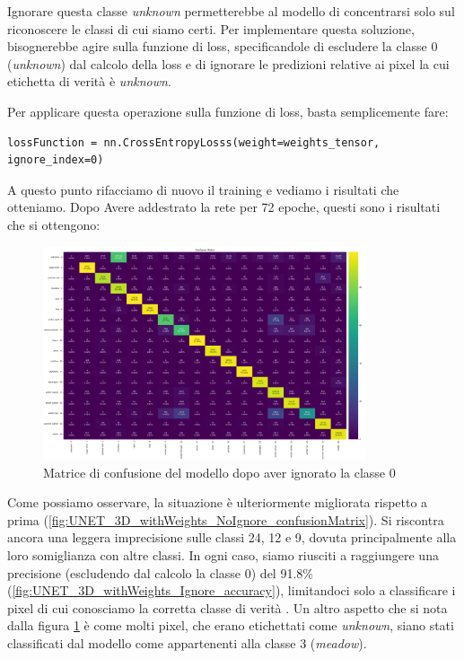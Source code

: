 Ignorare questa classe \textit{unknown} permetterebbe al modello di concentrarsi solo 
sul riconoscere le classi di cui siamo certi. 
Per implementare questa soluzione, bisognerebbe agire sulla funzione di loss, 
specificandole di escludere la classe 0 (\textit{unknown}) dal calcolo della loss e 
di ignorare le predizioni relative ai pixel la cui etichetta di verità è \textit{unknown}.

Per applicare questa operazione sulla funzione di loss, basta semplicemente fare:
\begin{lstlisting}
lossFunction = nn.CrossEntropyLosss(weight=weights_tensor, ignore_index=0)
\end{lstlisting}

A questo punto rifacciamo di nuovo il training e vediamo i risultati che otteniamo. 
\newpage
Dopo Avere addestrato la rete per 72 epoche, questi sono i risultati che si ottengono:

\begin{figure}[H]
    \centering
    \includegraphics[angle=270,origin=c,width=0.85\textwidth]{Immagini/sperimentazione/UNET_3D_withWeights_Ignore_confusionMatrix_edited.png}
    \caption{Matrice di confusione del modello dopo aver ignorato la classe 0}
    \label{fig:UNET_3D_withWeights_Ignore_confusionMatrix}
\end{figure}

Come possiamo osservare, la situazione è ulteriormente migliorata rispetto a prima 
(\ref{fig:UNET_3D_withWeights_NoIgnore_confusionMatrix}).
Si riscontra ancora una leggera imprecisione sulle classi 24, 12 e 9, dovuta principalmente 
alla loro somiglianza con altre classi. In ogni caso, siamo riusciti a raggiungere una 
precisione (escludendo dal calcolo la classe 0) del 91.8\% 
(\ref{fig:UNET_3D_withWeights_Ignore_accuracy}), limitandoci solo a classificare i 
pixel di cui conosciamo la corretta classe di verità .
Un altro aspetto che si nota dalla figura \ref{fig:UNET_3D_withWeights_Ignore_confusionMatrix} 
è come molti pixel, che erano etichettati come \textit{unknown}, siano 
stati classificati dal modello come appartenenti alla classe 3 (\textit{meadow}).


